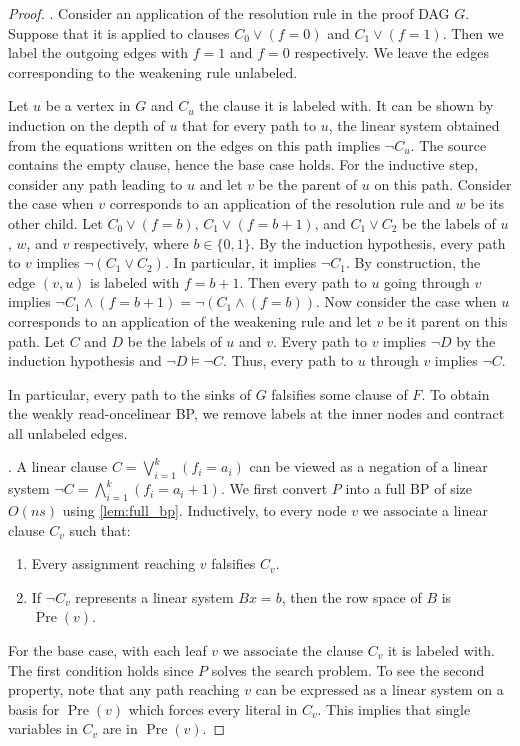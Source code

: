 \documentclass[a4paper,11pt,draft]{article}
\theoremstyle{definition}
\theoremstyle{remark}
\DeclareMathOperator{\pre}{Pre}
\newcommand{\wreadonce}{weakly read-once}
\begin{document}
\begin{proof}
   .
  Consider an application of the resolution rule in the proof DAG $G$. Suppose that it is applied to clauses $C_0 \lor (f = 0)$ and $C_1 \lor (f = 1)$. Then we label the outgoing edges with $f=1$ and $f=0$ respectively.
  We leave the edges corresponding to the weakening rule unlabeled.

  Let $u$ be a vertex in $G$ and $C_u$ the clause it is labeled with. It can be shown by induction on the depth of $u$ that for every path to $u$, the linear system obtained from the equations written on the edges on this path implies $\neg C_u$. The source contains the empty clause, hence the base case holds. For the inductive step, consider any path leading to $u$ and let $v$ be the parent of $u$ on this path. Consider the case when $v$ corresponds to an application of the resolution rule and $w$ be its other child. Let $C_0 \lor (f=b)$, $C_1 \lor (f=b+1)$, and $C_1 \lor C_2$ be the labels of $u$, $w$, and $v$ respectively, where $b \in \{0,1\}$. By the induction hypothesis, every path to $v$ implies $\neg (C_1 \lor C_2)$. In particular, it implies $\neg C_1$. By construction, the edge $(v, u)$ is labeled with $f=b+1$. Then every path to $u$ going through $v$ implies $\neg C_1 \land (f=b+1) = \neg (C_1 \land (f = b))$. Now consider the case when $u$ corresponds to an application of the weakening rule and let $v$ be it parent on this path. Let $C$ and $D$ be the labels of $u$ and $v$. Every path to $v$ implies $\neg D$ by the induction hypothesis and $\neg D \vDash \neg C$. Thus, every path to $u$ through $v$ implies $\neg C$.

  In particular, every path to the sinks of $G$ falsifies some clause of $F$. To obtain the \wreadonce linear BP, we remove labels at the inner nodes and contract all unlabeled edges.

  \medskip
  .
  A linear clause $C = \bigvee_{i=1}^k (f_i = a_i)$ can be viewed as a negation of a linear system $\neg C = \bigwedge_{i=1}^k (f_i = a_i + 1)$.
  We first convert $P$ into a full BP of size $O(ns)$ using \cref{lem:full_bp}. Inductively, to every node $v$ we associate a linear clause $C_v$ such that:
  \begin{enumerate}
    \item Every assignment reaching $v$ falsifies $C_v$.
    \item If $\neg C_v$ represents a linear system $Bx = b$, then the row space of $B$ is $\pre(v)$.
  \end{enumerate}
  For the base case, with each leaf $v$ we associate the clause $C_v$ it is labeled with. The first condition holds since $P$ solves the search problem. To see the second property, note that any path reaching $v$ can be expressed as a linear system on a basis for $\pre(v)$ which forces every literal in $C_v$. This implies that single variables in $C_v$ are in $\pre(v)$.


\end{proof}
\end{document}
